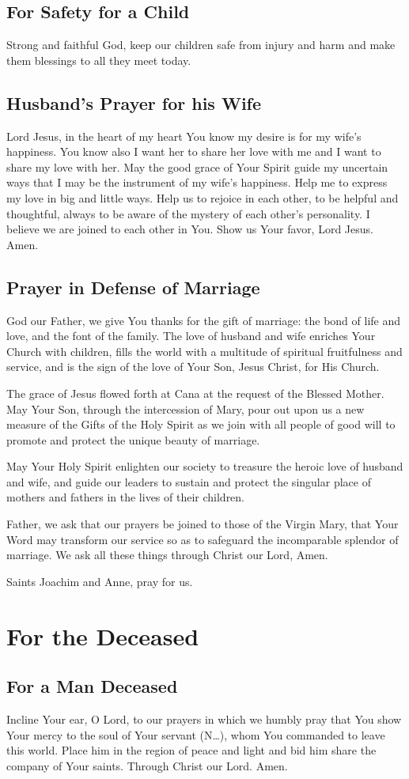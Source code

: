\documentclass[12pt]{article}
\newcommand{\prayersection}[1]{\section{#1}}
\newcommand{\prayertitle}[1]{\subsection{#1}}
\newcommand{\insertname}{(N\dots)}
\begin{document}
\prayertitle{For Safety for a Child}
Strong and faithful God, keep our children safe from injury and harm and make them blessings to all they meet today.

\prayertitle{Husband's Prayer for his Wife}
Lord Jesus, in the heart of my heart You know my desire is for my wife's happiness.
You know also I want her to share her love with me and I want to share my love with her.
May the good grace of Your Spirit guide my uncertain ways that I may be the instrument of my wife's happiness.
Help me to express my love in big and little ways.
Help us to rejoice in each other, to be helpful and thoughtful, always to be aware of the mystery of each other's personality.
I believe we are joined to each other in You.
Show us Your favor, Lord Jesus.
Amen.
\newpage
\prayertitle{Prayer in Defense of Marriage}
God our Father, we give You thanks for the gift of marriage:
the bond of life and love, and the font of the family. 
The love of husband and wife enriches Your Church with children, fills the world with a multitude of spiritual fruitfulness and service,
and is the sign of the love of Your Son, Jesus Christ, for His Church.

The grace of Jesus flowed forth at Cana at the request of the Blessed Mother.
May Your Son, through the intercession of Mary, pour out upon us a new measure of the Gifts of the Holy Spirit as we join with all people of good will to promote and protect the unique beauty of marriage.

May Your Holy Spirit enlighten our society to treasure the heroic love of husband and wife, and guide our leaders to sustain and protect
the singular place of mothers and fathers in the lives of their children.

Father, we ask that our prayers be joined to those of the Virgin Mary, that Your Word may transform our service so as to safeguard the incomparable splendor of marriage.
We ask all these things through Christ our Lord,
Amen.

Saints Joachim and Anne, pray for us.

\newpage

\prayersection{For the Deceased}

\prayertitle{For a Man Deceased}
Incline Your ear, O Lord, to our prayers in which we humbly pray that You show Your mercy to the soul of Your servant \insertname, whom You commanded to leave this world.
Place him in the region of peace and light and bid him share the company of Your saints.
Through Christ our Lord. Amen.
\end{document}
